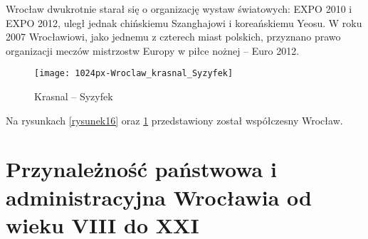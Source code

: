 \documentclass{article}
\begin{document}
\vspace{6pt}

\noindent Wrocław dwukrotnie starał się o organizację wystaw światowych: EXPO 2010 i EXPO 2012, uległ jednak chińskiemu Szanghajowi i koreańskiemu Yeosu. W roku 2007 Wrocławiowi, jako jednemu z czterech miast polskich, przyznano prawo organizacji meczów mistrzostw Europy w piłce nożnej – Euro 2012.

\begin{figure}[h]
\centering

\texttt{[image: 1024px-Wroclaw\_krasnal\_Syzyfek]}
\caption{Krasnal – Syzyfek}
\label{rysunek17}

\end{figure}

\noindent Na rysunkach \ref{rysunek16} oraz \ref{rysunek17} przedstawiony został współczesny Wrocław.

\section*{Przynależność państwowa i administracyjna Wrocławia od wieku VIII do XXI}
\end{document}

